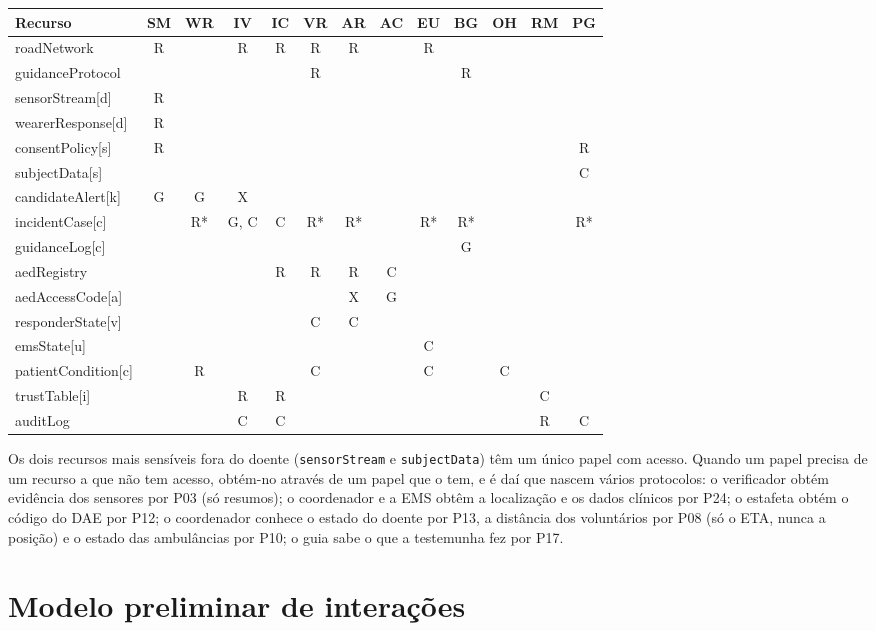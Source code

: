 \documentclass[10pt,a4paper]{article}
\newcommand{\id}[1]{\texttt{#1}}
\begin{document}
{\small
\noindent\begin{tabularx}{\linewidth}{@{}>{\ttfamily}X*{12}{c}@{}}
\toprule
\normalfont Recurso & SM & WR & IV & IC & VR & AR & AC & EU & BG & OH & RM & PG \\
\midrule
roadNetwork & R & & R & R & R & R & & R & & & & \\
guidanceProtocol & & & & & R & & & & R & & & \\
sensorStream[d] & R & & & & & & & & & & & \\
wearerResponse[d] & R & & & & & & & & & & & \\
consentPolicy[s] & R & & & & & & & & & & & R \\
subjectData[s] & & & & & & & & & & & & C \\
candidateAlert[k] & G & G & X & & & & & & & & & \\
incidentCase[c] & & R* & G, C & C & R* & R* & & R* & R* & & & R* \\
guidanceLog[c] & & & & & & & & & G & & & \\
aedRegistry & & & & R & R & R & C & & & & & \\
aedAccessCode[a] & & & & & & X & G & & & & & \\
responderState[v] & & & & & C & C & & & & & & \\
emsState[u] & & & & & & & & C & & & & \\
patientCondition[c] & & R & & & C & & & C & & C & & \\
trustTable[i] & & & R & R & & & & & & & C & \\
auditLog & & & C & C & & & & & & & R & C \\
\bottomrule
\end{tabularx}
}

Os dois recursos mais sensíveis fora do doente (\id{sensorStream} e \id{subjectData}) têm um único papel com acesso. Quando um papel precisa de um recurso a que não tem acesso, obtém-no através de um papel que o tem, e é daí que nascem vários protocolos: o verificador obtém evidência dos sensores por P03 (só resumos); o coordenador e a EMS obtêm a localização e os dados clínicos por P24; o estafeta obtém o código do DAE por P12; o coordenador conhece o estado do doente por P13, a distância dos voluntários por P08 (só o ETA, nunca a posição) e o estado das ambulâncias por P10; o guia sabe o que a testemunha fez por P17.

\section{Modelo preliminar de interações}\label{sec:interacoes}
\end{document}
